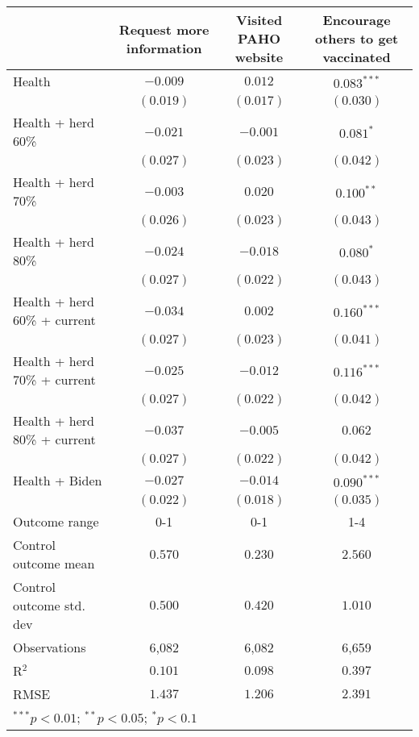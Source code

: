 \begin{table}
\begin{center}
\begin{tabular}{l c c c}
\hline
 & Request more information & Visited PAHO website & Encourage others to get vaccinated \\
\hline
Health                       & $-0.009$  & $0.012$   & $0.083^{***}$ \\
                             & $(0.019)$ & $(0.017)$ & $(0.030)$     \\
Health + herd 60\%           & $-0.021$  & $-0.001$  & $0.081^{*}$   \\
                             & $(0.027)$ & $(0.023)$ & $(0.042)$     \\
Health + herd 70\%           & $-0.003$  & $0.020$   & $0.100^{**}$  \\
                             & $(0.026)$ & $(0.023)$ & $(0.043)$     \\
Health + herd 80\%           & $-0.024$  & $-0.018$  & $0.080^{*}$   \\
                             & $(0.027)$ & $(0.022)$ & $(0.043)$     \\
Health + herd 60\% + current & $-0.034$  & $0.002$   & $0.160^{***}$ \\
                             & $(0.027)$ & $(0.023)$ & $(0.041)$     \\
Health + herd 70\% + current & $-0.025$  & $-0.012$  & $0.116^{***}$ \\
                             & $(0.027)$ & $(0.022)$ & $(0.042)$     \\
Health + herd 80\% + current & $-0.037$  & $-0.005$  & $0.062$       \\
                             & $(0.027)$ & $(0.022)$ & $(0.042)$     \\
Health + Biden               & $-0.027$  & $-0.014$  & $0.090^{***}$ \\
                             & $(0.022)$ & $(0.018)$ & $(0.035)$     \\
\hline
Outcome range                & 0-1       & 0-1       & 1-4           \\
Control outcome mean         & $0.570$   & $0.230$   & $2.560$       \\
Control outcome std. dev     & $0.500$   & $0.420$   & $1.010$       \\
Observations                 & 6,082     & 6,082     & 6,659         \\
R$^{2}$                      & $0.101$   & $0.098$   & $0.397$       \\
RMSE                         & $1.437$   & $1.206$   & $2.391$       \\
\hline
\multicolumn{4}{l}{\scriptsize{$^{***}p<0.01$; $^{**}p<0.05$; $^{*}p<0.1$}}
\end{tabular}
\caption{}
\label{table:Tables and Figures/SI_table22_allinfo_pooled_behav}
\end{center}
\end{table}
